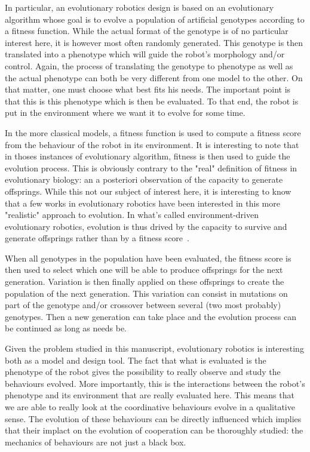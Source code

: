 
    In particular, an evolutionary robotics design is based on an evolutionary algorithm whose goal is to evolve a population of artificial genotypes according to a fitness function. While the actual format of the genotype is of no particular interest here, it is however most often randomly generated. This genotype is then translated into a phenotype which will guide the robot's morphology and/or control. Again, the process of translating the genotype to phenotype as well as the actual phenotype can both be very different from one model to the other. On that matter, one must choose what best fits his needs. The important point is that this is this phenotype which is then be evaluated. To that end, the robot is put in the environment where we want it to evolve for some time. 
    
    In the more classical models, a fitness function is used to compute a fitness score from the behaviour of the robot in its environment. It is interesting to note that in thoses instances of evolutionary algorithm, fitness is then used to guide the evolution process. This is obviously contrary to the "real" definition of fitness in evolutionary biology: an a posteriori observation of the capacity to generate offsprings. While this not our subject of interest here, it is interesting to know that a few works in evolutionary robotics have been interested in this more "realistic" approach to evolution. In what's called environment-driven evolutionary robotics, evolution is thus drived by the capacity to survive and generate offsprings rather than by a fitness score~\cite{Ray1991, Bianco2004, Bredeche2010}.

    When all genotypes in the population have been evaluated, the fitness score is then used to select which one will be able to produce offsprings for the next generation. Variation is then finally applied on these offsprings to create the population of the next generation. This variation can consist in mutations on part of the genotype and/or crossover between several (two most probably) genotypes. Then a new generation can take place and the evolution process can be continued as long as needs be.

    Given the problem studied in this manuscript, evolutionary robotics is interesting both as a model and design tool. The fact that what is evaluated is the phenotype of the robot gives the possibility to really observe and study the behaviours evolved. More importantly, this is the interactions between the robot's phenotype and its environment that are really evaluated here. This means that we are able to really look at the coordinative behaviours evolve in a qualitative sense. The evolution of these behaviours can be directly influenced which implies that their implact on the evolution of cooperation can be thoroughly studied: the mechanics of behaviours are not just a black box.

